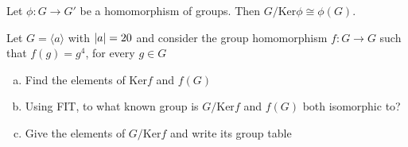\begin{theorem}
    Let $\phi : G \to G'$ be a homomorphism of groups. Then $G/\text{Ker}\phi \cong \phi(G)$. 
\end{theorem}

\begin{exercise}
    Let $G = \langle a \rangle$ with $\qty|a| = 20$ and consider the group homomorphism $f : G \to G$ such that $f(g) = g^4$, for every $g \in G$
    
    \begin{enumerate}[(a)]
        \item Find the elements of Ker$f$ and $f(G)$
        \item Using FIT, to what known group is $G/\text{Ker}f$ and $f(G)$ both isomorphic to?
        \item Give the elements of $G/\text{Ker}f$ and write its group table
    \end{enumerate}
\end{exercise}

